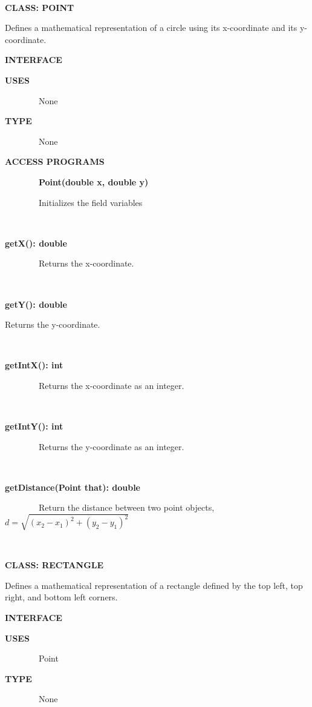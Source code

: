 \documentclass{article}
\begin{document}
{{~~~~~~~~~~~~~~~~}

{\textbf{CLASS: POINT}}

{Defines a mathematical representation of a circle using its
x-coordinate and its y-coordinate.}

{}

{\textbf{INTERFACE}}

{\textbf{USES}}

{~~~~~~~~None}

{\textbf{TYPE}}

{~~~~~~~~None}

{\textbf{ACCESS PROGRAMS}}

{~~~~~~~~\textbf{Point(double x, double y)}}

{~~~~~~~~Initializes the field variables}

{~~~~~~~~~~~~~~~~}

{\textbf{getX(): double}}

{~~~~~~~~Returns the x-coordinate.}

{~~~~~~~~~~~~~~~~}

{\textbf{getY(): double}}

{Returns the y-coordinate.}

{~~~~~~~~~~~~~~~~}

{\textbf{getIntX(): int}}

{~~~~~~~~Returns the x-coordinate as an integer.}

{~~~~~~~~~~~~~~~~}

{\textbf{getIntY(): int}}

{~~~~~~~~Returns the y-coordinate as an integer.}

{~~~~~~~~~~~~~~~~}

{\textbf{getDistance(Point that): double}}

{~~~~~~~~Return the distance between two point objects, \(d=\sqrt{(x_{2} - x_{1})^{2} + (y_{2} - y_{1})^{2}}\)}

{~~~~~~~~}

{}

{\textbf{CLASS: RECTANGLE}}

{Defines a mathematical representation of a rectangle defined by the top
left, top right, and bottom left corners.}

{}

{\textbf{INTERFACE}}

{\textbf{USES}}

{~~~~~~~~Point}

{\textbf{TYPE}}

{~~~~~~~~None}

}
\end{document}

